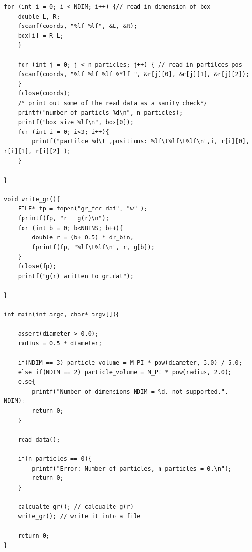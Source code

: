 \begin{lstlisting}[style=Cstyle]
   for (int i = 0; i < NDIM; i++) {// read in dimension of box 
    double L, R;
    fscanf(coords, "%lf %lf", &L, &R); 
    box[i] = R-L;
    }

    for (int j = 0; j < n_particles; j++) { // read in partilces pos
    fscanf(coords, "%lf %lf %lf %*lf ", &r[j][0], &r[j][1], &r[j][2]);
    }
    fclose(coords);
    /* print out some of the read data as a sanity check*/
    printf("number of particls %d\n", n_particles);
    printf("box size %lf\n", box[0]);
    for (int i = 0; i<3; i++){
        printf("partilce %d\t ,positions: %lf\t%lf\t%lf\n",i, r[i][0], r[i][1], r[i][2] );
    }

}

void write_gr(){
    FILE* fp = fopen("gr_fcc.dat", "w" );
    fprintf(fp, "r   g(r)\n");
    for (int b = 0; b<NBINS; b++){
        double r = (b+ 0.5) * dr_bin;
        fprintf(fp, "%lf\t%lf\n", r, g[b]);
    }
    fclose(fp);
    printf("g(r) written to gr.dat");
    
}

int main(int argc, char* argv[]){
    
    assert(diameter > 0.0);
    radius = 0.5 * diameter;

    if(NDIM == 3) particle_volume = M_PI * pow(diameter, 3.0) / 6.0;
    else if(NDIM == 2) particle_volume = M_PI * pow(radius, 2.0);
    else{
        printf("Number of dimensions NDIM = %d, not supported.", NDIM);
        return 0;
    }

    read_data();

    if(n_particles == 0){
        printf("Error: Number of particles, n_particles = 0.\n");
        return 0;
    }

    calcualte_gr(); // calcualte g(r)
    write_gr(); // write it into a file 

    return 0;
}


\end{lstlisting}
